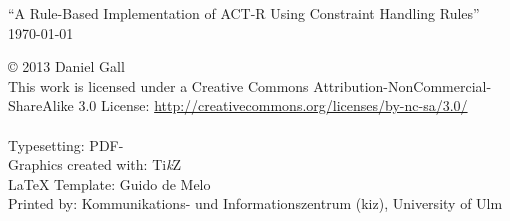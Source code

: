 \documentclass[
    a4paper,
    10pt,
    bibliography=totoc,
    twoside,
    openright,
    numbers=noenddot,
    headings=normal,
    DIV=9,
    BCOR=7mm
    ,parskip
]{scrbook}
\newcommand{\fullname}{Daniel Gall}
\newcommand{\titel}{A Rule-Based Implementation of ACT-R Using Constraint Handling Rules}
\newcommand{\jahr}{2013}
\newcommand{\arbeit}{Master Thesis}
\newcommand{\FIXME}[1]{} %
\begin{document}
\clearpage
\thispagestyle{empty}
{
    \small \flushleft \enquote{\titel}\\
    \today
    \vfill



    \copyright{} \jahr{} \fullname{}\\[0.5em]
    This work is licensed under a Creative Commons Attribution-NonCommercial-ShareAlike 3.0 License: \url{http://creativecommons.org/licenses/by-nc-sa/3.0/}\\
    \ccbyncsa\\
    \vspace{0.5cm}
    Typesetting: PDF-\LaTeXe{}\\
    Graphics created with: Ti\textit{k}Z\\
    \LaTeX{} Template: Guido de Melo\\
    Printed by: Kommunikations- und Informationszentrum (kiz), University of Ulm
}
\end{document}
